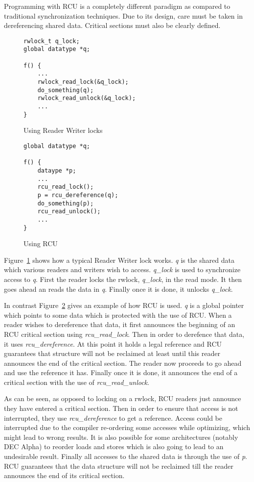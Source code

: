 Programming with RCU is a completely different paradigm as compared to traditional
synchronization techniques. Due to its design, care must be taken in dereferencing
shared data. Critical sections must also be clearly defined.


\begin{figure}[t]
\centering
\begin{lstlisting}
rwlock_t q_lock;
global datatype *q;

f() {
	...
	rwlock_read_lock(&q_lock);
	do_something(q);
	rwlock_read_unlock(&q_lock);
	...
}
\end{lstlisting}
\caption{Using Reader Writer locks}\label{fig:rwuse}
\end{figure}

\begin{figure}[b]
\centering
\begin{lstlisting}
global datatype *q;

f() {
	dataype *p;
	...
	rcu_read_lock();
	p = rcu_dereference(q);
	do_something(p);
	rcu_read_unlock();
	...
}
\end{lstlisting}
\caption{Using RCU}\label{fig:RCUuse}
\end{figure}

Figure~\ref{fig:rwuse} shows how a
typical Reader Writer lock works. \emph{q} is the shared data which various readers
and writers wish to access. \emph{q\_lock} is used to synchronize access to \emph{q}.
First the reader locks the rwlock, \emph{q\_lock},
in the read mode. It then goes ahead an reads the data in \emph{q}. Finally once it is
done, it unlocks \emph{q\_lock}.

In contrast Figure~\ref{fig:RCUuse} gives an example of how RCU is used. \emph{q} is a global pointer
which points to some data which is protected with the use of RCU. When a reader
wishes to dereference that data, it first announces the beginning of an RCU critical
section using \emph{rcu\_read\_lock}. Then in order to derefence that data, it 
uses \emph{rcu\_dereference}. At this
point it holds a legal reference and RCU guarantees that structure will not be
reclaimed at least until this reader announces the end of the critical section.
The reader now proceeds to go ahead and use the reference it has. Finally once it
is done, it announces the end of a critical section with the use of \emph{rcu\_read\_unlock}.

As can be seen, as opposed to locking on a rwlock, RCU readers just announce they
have entered a critical section. Then in order to ensure that access is not
interrupted, they use \emph{rcu\_dereference} to get a reference. Access could be interrupted
due to the compiler re-ordering some accesses while optimizing, which might lead
to wrong results. It is also possible for some architectures (notably DEC Alpha) to reorder
loads and stores which is also going to lead to an undesirable result. Finally all accesses
to the shared data is through the use of \emph{p}. RCU guarantees that the data structure
will not be reclaimed till the reader announces the end of its critical section.

